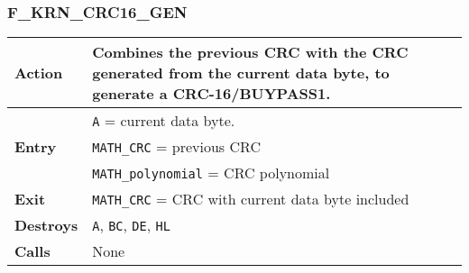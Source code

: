     \subsubsection{F\_KRN\_CRC16\_GEN}
    \label{func:fkrncrc16gen}
    \begin{tabular}{l p{9cm}}
        \hline\textbf{Action}
        & Combines the previous CRC with the CRC generated from the current
        data byte, to generate a CRC-16/BUYPASS1.\\
        \hline\multirow[t]{3}{4em}{\textbf{Entry}}
        & \texttt{A} = current data byte.\\
        & \texttt{MATH\_CRC} = previous CRC\\
        & \texttt{MATH\_polynomial} = CRC polynomial\\
        \hline\textbf{Exit}
        & \texttt{MATH\_CRC} = CRC with current data byte included\\
        \hline\textbf{Destroys} & \texttt{A}, \texttt{BC}, \texttt{DE}, \texttt{HL} \\
        \hline\textbf{Calls} & None\\
        \hline
    \end{tabular}
